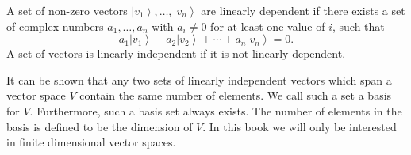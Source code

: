 A set of non-zero vectors $\left|v_{1}\right\rangle, \ldots,\left|v_{n}\right\rangle$ are linearly dependent if there exists a set of complex numbers $a_{1}, \ldots, a_{n}$ with $a_{i} \neq 0$ for at least one value of $i$, such that
\begin{equation}
    a_{1}\left|v_{1}\right\rangle+a_{2}\left|v_{2}\right\rangle+\cdots+a_{n}\left|v_{n}\right\rangle=0.
\end{equation}
A set of vectors is linearly independent if it is not linearly dependent. 

It can be shown that any two sets of linearly independent vectors which span a vector space $V$ contain the same number of elements. We call such a set a basis for $V$. Furthermore, such a basis set always exists. The number of elements in the basis is defined to be the dimension of $V$. In this book we will only be interested in finite dimensional vector spaces. 

